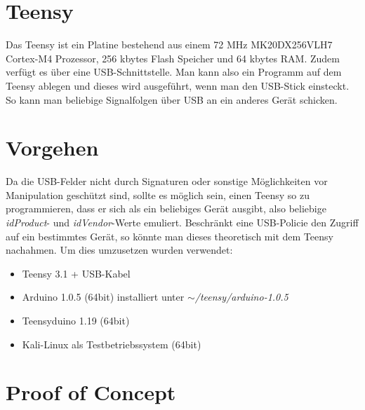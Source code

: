\section{Teensy}
Das Teensy ist ein Platine bestehend aus einem 72 MHz MK20DX256VLH7 Cortex-M4 Prozessor, 256 kbytes Flash Speicher und 64 kbytes RAM. Zudem verfügt es über eine USB-Schnittstelle. Man kann also ein Programm auf dem Teensy ablegen und dieses wird ausgeführt, wenn man den USB-Stick einsteckt. So kann man beliebige Signalfolgen über USB an ein anderes Gerät schicken.
			
\section{Vorgehen}
Da die USB-Felder nicht durch Signaturen oder sonstige Möglichkeiten vor Manipulation geschützt sind, sollte es möglich sein, einen Teensy so zu programmieren, dass er sich als ein beliebiges Gerät ausgibt, also beliebige \textit{idProduct}- und \textit{idVendor}-Werte emuliert. Beschränkt eine USB-Policie den Zugriff auf ein bestimmtes Gerät, so könnte man dieses theoretisch mit dem Teensy nachahmen. 
Um dies umzusetzen wurden verwendet:
\begin{itemize}
	\item Teensy 3.1 + USB-Kabel
	\item Arduino 1.0.5 (64bit) installiert unter \textit{$\sim$/teensy/arduino-1.0.5}
	\item Teensyduino 1.19 (64bit)
	\item Kali-Linux als Testbetriebssystem (64bit)
\end{itemize}


\section{Proof of Concept} \label{PoC}